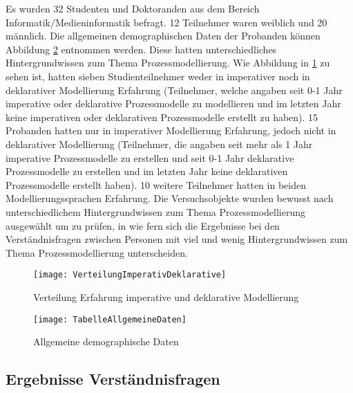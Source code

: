 Es wurden 32 Studenten und Doktoranden aus dem Bereich Informatik/Medieninformatik befragt. 12 Teilnehmer waren weiblich und 20 männlich. Die allgemeinen demographischen Daten der Probanden können Abbildung \ref{fig:TabelleAllgemeineDaten} entnommen werden. Diese hatten unterschiedliches Hintergrundwissen zum Thema Prozessmodellierung. Wie Abbildung in \ref{fig:VerteilungImperativDeklarative} zu sehen ist, hatten sieben Studienteilnehmer weder in imperativer noch in deklarativer Modellierung Erfahrung (Teilnehmer, welche angaben seit 0-1 Jahr imperative oder deklarative Prozessmodelle zu modellieren und im letzten Jahr keine imperativen oder deklarativen Prozessmodelle erstellt zu haben). 15 Probanden hatten nur in imperativer Modellierung Erfahrung, jedoch nicht in deklarativer Modellierung (Teilnehmer, die angaben seit mehr als 1 Jahr imperative Prozessmodelle zu erstellen und seit 0-1 Jahr deklarative Prozessmodelle zu erstellen und im letzten Jahr keine deklarativen Prozessmodelle erstellt haben). 10 weitere Teilnehmer hatten in beiden Modellierungssprachen Erfahrung. Die Versuchsobjekte wurden bewusst nach unterschiedlichem Hintergrundwissen zum Thema Prozessmodellierung ausgewählt um zu prüfen, in wie fern sich die Ergebnisse bei den Verständnisfragen zwischen Personen mit viel und wenig Hintergrundwissen zum Thema Prozessmodellierung unterscheiden.\newline


\begin{figure}[htp]
\begin{center}
  \texttt{[image: VerteilungImperativDeklarative]} %
  \caption{Verteilung Erfahrung imperative und deklarative Modellierung}
  \label{fig:VerteilungImperativDeklarative}
\end{center}
\end{figure}

\begin{figure}[htp]
\begin{center}
  \texttt{[image: TabelleAllgemeineDaten]} %
  \caption{Allgemeine demographische Daten}
  \label{fig:TabelleAllgemeineDaten}
\end{center}
\end{figure}



\subsection{Ergebnisse Verständnisfragen}


